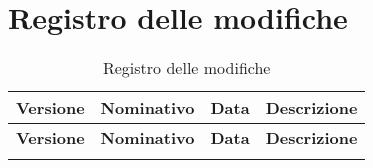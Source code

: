 
\setlength{\headheight}{1.8cm}

\newpage
\pagestyle{nopage}

\section*{Registro delle modifiche}%
\label{sec:registro_delle_modifiche}

\renewcommand{\arraystretch}{2} %
\begin{longtable}[H]{>{\centering\bfseries}m{2cm} >{\centering}m{5cm} >{\centering}m{2.5cm} >{\centering\arraybackslash}m{6.5cm}}
  \caption{Registro delle modifiche}%
  \label{tab:registro_delle_modifiche}                                                    \\
  \rowcolor{lightgray}
  {\textbf{Versione}} & {\textbf{Nominativo}} & {\textbf{Data}} & {\textbf{Descrizione}}  \\
  \endfirsthead%
  \rowcolor{lightgray}
  {\textbf{Versione}} & {\textbf{Nominativo}} & {\textbf{Data}} & {\textbf{Descrizione}}  \\
  \endhead%
  \modifiche{}%
\end{longtable}

\newpage
\thispagestyle{nopage}
\tableofcontents

\elencoFigure{}%

\elencoTabelle{}%

\newpage

\pagestyle{usual}
